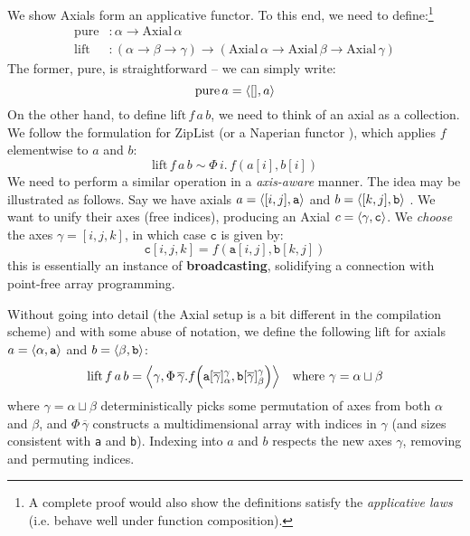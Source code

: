 We show Axials form an applicative functor. To this end, we need to define:\footnote{A complete proof would also show the definitions satisfy the \textit{applicative laws} (i.e. behave well under function composition).}
\begin{align*}
\mathrm{pure} &: \alpha \to \mathrm{Axial}\,\alpha \\
\mathrm{lift} &: (\alpha \to \beta \to \gamma) \to (\mathrm{Axial}\,\alpha \to \mathrm{Axial}\,\beta \to \mathrm{Axial}\,\gamma) 
\end{align*}
The former, $\mathrm{pure}$, is straightforward -- we can simply write:
$$ \mathrm{pure}\,a = \phipair{[]}{a} $$
On the other hand, to define $\mathrm{lift}\,f\,a\,b$, we need to think of an axial as a collection. We follow the formulation for $\mathrm{ZipList}$ (or a Naperian functor \cite{gibbons2016aplicative}), which applies $f$ elementwise to $a$ and $b$:
$$ \mathrm{lift}\,f\,a\,b \sim \Phi\, i.\, f(a[i], b[i]) $$
We need to perform a similar operation in a \textit{axis-aware} manner. The idea may be illustrated as follows. Say we have axials $a = \phipair{[i, j]}{\texttt{a}}$ and $b = \phipair{[k, j]}{\texttt{b}}$ . We want to unify their axes (free indices), producing an Axial $c = \phipair{\gamma}{\texttt{c}}$. We \textit{choose} the axes $\gamma = [i, j, k]$, in which case $\texttt{c}$ is given by:
$$ \texttt{c}[i, j, k] = f(\texttt{a}[i, j], \texttt{b}[k, j]) $$
this is essentially an instance of \textbf{broadcasting}, solidifying a connection with point-free array programming.

Without going into detail (the Axial setup is a bit different in the compilation scheme) and with some abuse of notation, we define the following $\mathrm{lift}$ for axials $a = \phipair{\alpha}{\texttt{a}}$ and $b = \phipair{\beta}{\texttt{b}}$:
$$ 
\mathrm{lift}\,f\,a\,b = \phipair{\gamma}{\Phi\,\overline{\gamma}. 
f \left( \texttt{a}[\overline{\gamma}]_\alpha^\gamma, \texttt{b}[\overline{\gamma}]_\beta^\gamma \right) } \quad \text{where } \gamma = \alpha \sqcup \beta
$$
where $\gamma = \alpha \sqcup \beta$ deterministically picks some permutation of axes from both $\alpha$ and $\beta$, and $\Phi\,\overline{\gamma}$ constructs a multidimensional array with indices in $\gamma$ (and sizes consistent with \texttt{a} and \texttt{b}). 
Indexing into $a$ and $b$ respects the new axes $\gamma$, removing and permuting indices.

